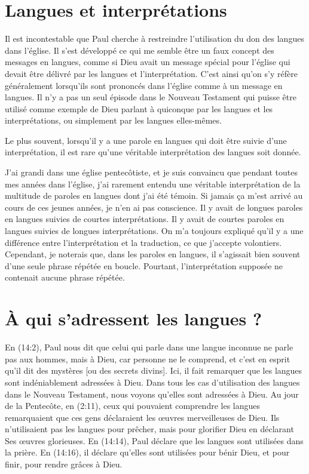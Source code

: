 \section{Langues et interpr\'etations}

Il est incontestable que Paul cherche à restreindre l'utilisation
 du don des langues dans l'église. Il s'est développé ce qui me semble
 être un faux concept des \Og messages \Fg{} en langues,
 comme si Dieu avait un message spécial pour l'église qui devait être délivré
 par les langues et l'interprétation. C'est ainsi qu'on s'y réfère
 généralement lorsqu'ils sont prononcés dans l'église
 \ocadr comme à un message en langues.
 Il n'y a pas un seul épisode dans le Nouveau Testament
 qui puisse être utilisé comme exemple de Dieu parlant à quiconque
 par les langues et les interprétations, ou simplement par les langues
 elles-mêmes.

Le plus souvent, lorsqu'il y a une parole en langues qui doit être suivie
 d'une interprétation, il est rare qu'une véritable interprétation
 des langues soit donnée.

J'ai grandi dans une église pentecôtiste, et je suis convaincu que pendant
 toutes mes années dans l'église, j'ai rarement entendu une véritable
 interprétation de la multitude de paroles en langues dont j'ai été témoin.
 Si jamais ça m'est arrivé au cours de ces jeunes années, je n'en ai pas conscience.
 Il y avait de longues paroles en langues suivies de courtes interprétations.
 Il y avait de courtes paroles en langues suivies de longues interprétations.
 On m'a toujours expliqué qu'il y a une différence entre l'interprétation
 et la traduction, ce que j'accepte volontiers. Cependant, je noterais que,
 dans les paroles en langues, il s'agissait bien souvent d'une seule phrase
 répétée en boucle. Pourtant, l'interprétation supposée ne contenait aucune phrase
 répétée.


\section{\`A qui s'adressent les langues ?}


En (14:2), Paul nous dit que celui qui parle dans une
 langue inconnue \Og ne parle pas aux hommes, mais à Dieu, car personne
 ne le comprend, et c'est en esprit qu'il dit des mystères
 [ou des secrets divins]. \Fg{} Ici, il fait remarquer que les langues
 sont indéniablement adressées à Dieu. Dans tous les cas d'utilisation
 des langues dans le Nouveau Testament, nous voyons qu'elles sont adressées
 à Dieu. Au jour de la Pentecôte, en (2:11),
 ceux qui pouvaient comprendre les langues remarquaient que ces gens
 déclaraient les œuvres merveilleuses de Dieu. Ils n'utilisaient pas
 les langues pour prêcher, mais pour glorifier Dieu
 en déclarant Ses œuvres glorieuses.
 En (14:14), Paul déclare que les langues sont utilisées
 dans la prière. En (14:16), il déclare
 qu'elles sont utilisées pour bénir Dieu, et pour finir,
 pour rendre grâces à Dieu.

